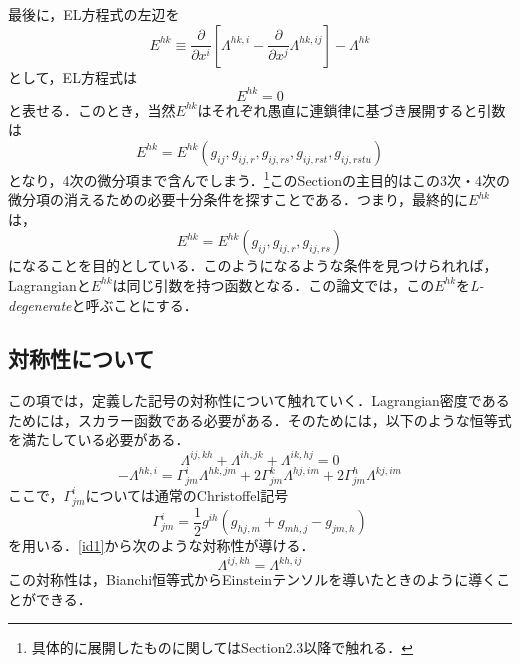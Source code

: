 \documentclass[12pt, a4paper]{jsarticle}
\newcommand{\lam}[1]{\varLambda^{#1}}
\begin{document}
最後に，EL方程式の左辺を
\begin{equation*}
  E^{hk} \equiv \dfrac{\partial }{\partial x^i }\left[ \varLambda^{hk,i} - \dfrac{\partial }{\partial x^j }\varLambda^{hk,ij} \right] - \varLambda^{hk}
  \tag{2.4} \label{elleft}
\end{equation*}
として，EL方程式は
\begin{equation*}
  E^{hk} =0
  \tag{2.3} \label{el}
\end{equation*}
と表せる．このとき，当然\(E^{hk}\)はそれぞれ愚直に連鎖律に基づき展開すると引数は
\begin{equation*}
  E^{hk} = E^{hk}(g_{ij}, g_{ij,r}, g_{ij,rs}, g_{ij,rst}, g_{ij,rstu})
  \tag{2.5} \label{ehk4}
\end{equation*}
となり，4次の微分項まで含んでしまう．\footnote{具体的に展開したものに関してはSection2.3以降で触れる．}このSectionの主目的はこの3次・4次の微分項の消えるための必要十分条件を探すことである．つまり，最終的に\(E^{hk}\)は，
\begin{equation*}
  E^{hk} = E^{hk}(g_{ij}, g_{ij,r}, g_{ij,rs})
  \tag{2.6} \label{ehk2}
\end{equation*}
になることを目的としている．このようになるような条件を見つけられれば， Lagrangianと\(E^{hk}\)は同じ引数を持つ函数となる．この論文では，この\(E^{hk}\)を\textit{L-degenerate}と呼ぶことにする．

\subsection{対称性について}
この項では，定義した記号の対称性について触れていく．Lagrangian密度であるためには，スカラー函数である必要がある．そのためには，以下のような恒等式を満たしている必要がある．
\begin{equation*}
  \varLambda^{ij,kh}+\varLambda^{ih,jk}+\varLambda^{ik,hj}=0
  \tag{2.7} \label{id1}
\end{equation*}
\begin{equation*}
  -\varLambda^{hk,i} = \varGamma^i_{jm} \lam{hk,jm}+2\varGamma^k_{jm} \lam{hj,im}+2\varGamma^h_{jm} \lam{kj,im}
  \tag{2.8} \label{id2}
\end{equation*}
ここで，\(\varGamma^i_{jm}\)については通常のChristoffel記号
\begin{equation*}
  \varGamma^i_{jm} = \dfrac{1}{2}g^{ih}(g_{hj,m}+g_{mh,j}-g_{jm,h})
\end{equation*}
を用いる．\eqref{id1}から次のような対称性が導ける．
\begin{equation*}
  \lam{ij,kh} = \lam{kh,ij}
  \tag{2.9} \label{sym1}
\end{equation*}
この対称性は，Bianchi恒等式からEinsteinテンソルを導いたときのように導くことができる．
\end{document}
